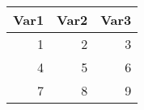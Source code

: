 \begin{tabular}{ r r r }
	Var1 & Var2 & Var3 \\
	\hline
	1 & 2 & 3 \\
	4 & 5 & 6 \\
	7 & 8 & 9 \\
\end{tabular}